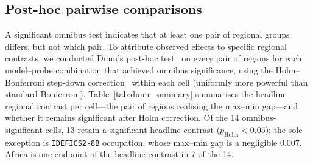 \documentclass[letterpaper]{article} %
\newcommand{\model}[1]{\texttt{#1}}
\begin{document}
\subsection{Post-hoc pairwise comparisons}
\label{app:stats_posthoc}

A significant omnibus test indicates that at least one pair of regional groups differs, but not which pair. To attribute observed effects to specific regional contrasts, we conducted Dunn's post-hoc test~\citep{dunn1964multiple} on every pair of regions for each model--probe combination that achieved omnibus significance, using the Holm--Bonferroni step-down correction~\citep{holm1979simple} within each cell (uniformly more powerful than standard Bonferroni). Table~\ref{tab:dunn_summary} summarises the headline regional contrast per cell---the pair of regions realising the max--min gap---and whether it remains significant after Holm correction. Of the 14 omnibus-significant cells, 13 retain a significant headline contrast ($p_{\text{Holm}} < 0.05$); the sole exception is \model{IDEFICS2-8B} occupation, whose max--min gap is a negligible $0.007$. Africa is one endpoint of the headline contrast in 7 of the 14.
\end{document}
